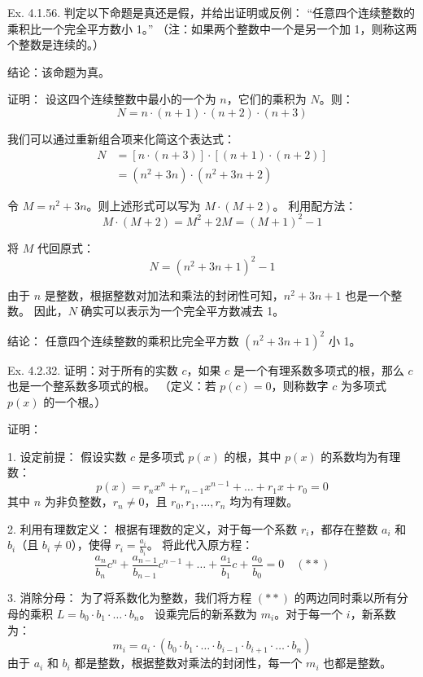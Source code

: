 \begin{questions}
\question
Ex. 4.1.56. 判定以下命题是真还是假，并给出证明或反例：
“任意四个连续整数的乘积比一个完全平方数小 1。”
（注：如果两个整数中一个是另一个加 1，则称这两个整数是连续的。）

\begin{solution}
结论：该命题为真。

证明：
设这四个连续整数中最小的一个为 $n$，它们的乘积为 $N$。则：
\[ N = n \cdot (n+1) \cdot (n+2) \cdot (n+3) \]

我们可以通过重新组合项来化简这个表达式：
\begin{align}
N &= [n \cdot (n+3)] \cdot [(n+1) \cdot (n+2)] \\
&= (n^2 + 3n) \cdot (n^2 + 3n + 2)
\end{align}

令 $M = n^2 + 3n$。则上述形式可以写为 $M \cdot (M + 2)$。
利用配方法：
\[ M \cdot (M + 2) = M^2 + 2M = (M + 1)^2 - 1 \]

将 $M$ 代回原式：
\[ N = (n^2 + 3n + 1)^2 - 1 \]

由于 $n$ 是整数，根据整数对加法和乘法的封闭性可知，$n^2 + 3n + 1$ 也是一个整数。
因此，$N$ 确实可以表示为一个完全平方数减去 1。

结论： 任意四个连续整数的乘积比完全平方数 $(n^2 + 3n + 1)^2$ 小 1。
\end{solution}

\question
Ex. 4.2.32. 证明：对于所有的实数 $c$，如果 $c$ 是一个有理系数多项式的根，那么 $c$ 也是一个整系数多项式的根。
（定义：若 $p(c) = 0$，则称数字 $c$ 为多项式 $p(x)$ 的一个根。）

\begin{solution}
证明：

1. 设定前提：
   假设实数 $c$ 是多项式 $p(x)$ 的根，其中 $p(x)$ 的系数均为有理数：
   \[ p(x) = r_n x^n + r_{n-1} x^{n-1} + \dots + r_1 x + r_0 = 0 \]
   其中 $n$ 为非负整数，$r_n \neq 0$，且 $r_0, r_1, \dots, r_n$ 均为有理数。

2. 利用有理数定义：
   根据有理数的定义，对于每一个系数 $r_i$，都存在整数 $a_i$ 和 $b_i$（且 $b_i \neq 0$），使得 $r_i = \frac{a_i}{b_i}$。
   将此代入原方程：
   \[ \frac{a_n}{b_n} c^n + \frac{a_{n-1}}{b_{n-1}} c^{n-1} + \dots + \frac{a_1}{b_1} c + \frac{a_0}{b_0} = 0 \quad (\ast\ast) \]

3. 消除分母：
   为了将系数化为整数，我们将方程 $(\ast\ast)$ 的两边同时乘以所有分母的乘积 $L = b_0 \cdot b_1 \cdot \dots \cdot b_n$。
   设乘完后的新系数为 $m_i$。对于每一个 $i$，新系数为：
   \[ m_i = a_i \cdot (b_0 \cdot b_1 \cdot \dots \cdot b_{i-1} \cdot b_{i+1} \cdot \dots \cdot b_n) \]
   由于 $a_i$ 和 $b_i$ 都是整数，根据整数对乘法的封闭性，每一个 $m_i$ 也都是整数。


\end{solution}
\end{questions}
